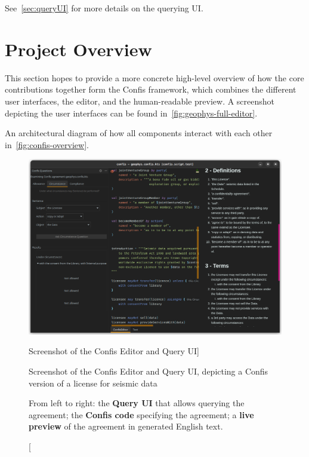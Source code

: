 See~\autoref{sec:queryUI} for more details on the querying UI\@.





\section{Project Overview}\label{sec:project-overview}

This section hopes to provide a more concrete high-level overview of how the core contributions together form the Confis framework, which combines the different user interfaces, the editor, and the human-readable preview.
A screenshot depicting the user interfaces can be found in~\autoref{fig:geophys-full-editor}.

An architectural diagram of how all components interact with each other in~\autoref{fig:confis-overview}.

\begin{figure}[h]
    \centering
    \includegraphics[width=\columnwidth]{figures/confis.full-geophys}
    \caption
    [Screenshot of the Confis Editor and Query UI]
    {Screenshot of the Confis Editor and Query UI, depicting a Confis version of a license for seismic data~\cite{seismicDataLicence}
    \par\footnotesize

    From left to right: the \textbf{Query UI} that allows querying the agreement; the \textbf{Confis code} specifying the agreement; a \textbf{live preview} of the agreement in generated English text.
    }
    \label{fig:geophys-full-editor}
\end{figure}

